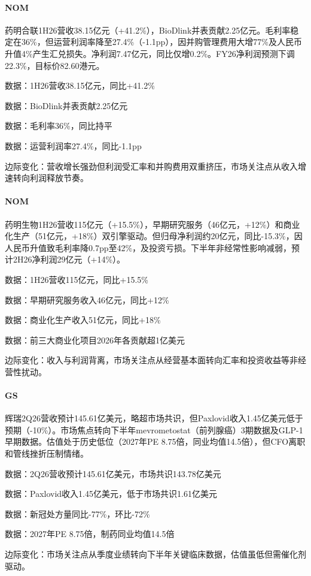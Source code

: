 \documentclass[11pt]{ctexart}
\begin{document}
\paragraph{NOM} 药明合联1H26营收38.15亿元（+41.2\%），BioDlink并表贡献2.25亿元。毛利率稳定在36\%，但运营利润率降至27.4\%（-1.1pp），因并购管理费用大增77\%及人民币升值4\%产生汇兑损失。净利润7.47亿元，同比仅增0.2\%。FY26净利润预测下调22.3\%，目标价82.60港元。
{\small\color{refgray}数据：1H26营收38.15亿元，同比+41.2\%\par}
{\small\color{refgray}数据：BioDlink并表贡献2.25亿元\par}
{\small\color{refgray}数据：毛利率36\%，同比持平\par}
{\small\color{refgray}数据：运营利润率27.4\%，同比-1.1pp\par}
{\small\color{refgray}边际变化：营收增长强劲但利润受汇率和并购费用双重挤压，市场关注点从收入增速转向利润释放节奏。\par}
\paragraph{NOM} 药明生物1H26营收115亿元（+15.5\%），早期研究服务（46亿元，+12\%）和商业化生产（51亿元，+18\%）双引擎驱动。但归母净利润约20亿元，同比-15.3\%，因人民币升值致毛利率降0.7pp至42\%，及投资亏损。下半年非经常性影响减弱，预计2H26净利润29亿元（+14\%）。
{\small\color{refgray}数据：1H26营收115亿元，同比+15.5\%\par}
{\small\color{refgray}数据：早期研究服务收入46亿元，同比+12\%\par}
{\small\color{refgray}数据：商业化生产收入51亿元，同比+18\%\par}
{\small\color{refgray}数据：前三大商业化项目2026年各贡献超1亿美元\par}
{\small\color{refgray}边际变化：收入与利润背离，市场关注点从经营基本面转向汇率和投资收益等非经营性扰动。\par}
\paragraph{GS} 辉瑞2Q26营收预计145.61亿美元，略超市场共识，但Paxlovid收入1.45亿美元低于预期（-10\%）。市场焦点转向下半年mevrometostat（前列腺癌）3期数据及GLP-1早期数据。估值处于历史低位（2027年PE 8.75倍，同业均值14.5倍），但CFO离职和管线挫折压制情绪。
{\small\color{refgray}数据：2Q26营收预计145.61亿美元，市场共识143.78亿美元\par}
{\small\color{refgray}数据：Paxlovid收入1.45亿美元，低于市场共识1.61亿美元\par}
{\small\color{refgray}数据：新冠处方量同比-77\%，环比-72\%\par}
{\small\color{refgray}数据：2027年PE 8.75倍，制药同业均值14.5倍\par}
{\small\color{refgray}边际变化：市场关注点从季度业绩转向下半年关键临床数据，估值虽低但需催化剂驱动。\par}
\end{document}

